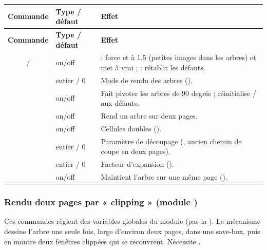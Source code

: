 \begin{longtable}{C T F}
\toprule
\textbf{Commande} & \textbf{Type / défaut} & \textbf{Effet} \\
\midrule
\endfirsthead
\toprule
\textbf{Commande} & \textbf{Type / défaut} & \textbf{Effet} \\
\midrule
\endhead
\bottomrule
\endfoot

 /  & on/off &  : force  et
 à 1.5 (petites images dans les arbres) et met 
à vrai ;  : rétablit les défauts. \\
\addlinespace

    & entier / 0 & Mode de rendu des arbres (). \\
\addlinespace

\label{sideways}
    & on/off & Fait pivoter les arbres de 90 degrés ; réinitialise
/ aux défauts. \\
\addlinespace

    & on/off & Rend un arbre sur deux pages. \\
\addlinespace
{} & on/off & Cellules doubles (). \\
\addlinespace

       & entier / 0 & Paramètre de découpage (, ancien
chemin de coupe en deux pages). \\
\addlinespace

      & entier / 0 & Facteur d'expansion (). \\
\addlinespace
{}    & on/off & Maintient l'arbre sur une même page
(). \\
\end{longtable}

\subsubsection*{Rendu deux pages par « clipping » (module )}

\noindent
Ces commandes règlent des variables globales du module  (pas la
). Le mécanisme dessine l'arbre une seule fois, large d'environ deux
pages, dans une save-box, puis en montre deux fenêtres clippées qui se
recouvrent. Nécessite .

